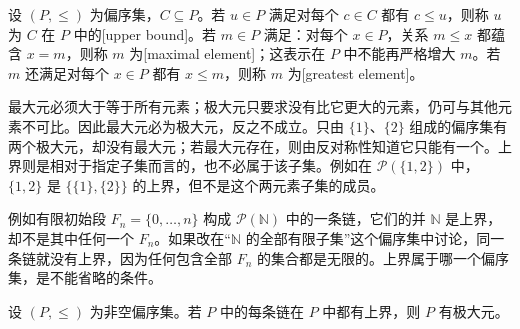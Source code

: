 \begin{definition}\label{b1:def:A-upper-maximal}
	设 \((P,\leq)\) 为偏序集，\(C\subseteq P\)。若 \(u\in P\) 满足对每个 \(c\in C\) 都有 \(c\leq u\)，则称 \(u\) 为 \(C\) 在 \(P\) 中的[upper bound]。若 \(m\in P\) 满足：对每个 \(x\in P\)，关系 \(m\leq x\) 都蕴含 \(x=m\)，则称 \(m\) 为[maximal element]；这表示在 \(P\) 中不能再严格增大 \(m\)。若 \(m\) 还满足对每个 \(x\in P\) 都有 \(x\leq m\)，则称 \(m\) 为[greatest element]。
\end{definition}

最大元必须大于等于所有元素；极大元只要求没有比它更大的元素，仍可与其他元素不可比。因此最大元必为极大元，反之不成立。只由 \(\{1\}\)、\(\{2\}\) 组成的偏序集有两个极大元，却没有最大元；若最大元存在，则由反对称性知道它只能有一个。上界则是相对于指定子集而言的，也不必属于该子集。例如在 \(\mathcal P(\{1,2\})\) 中，\(\{1,2\}\) 是 \(\{\{1\},\{2\}\}\) 的上界，但不是这个两元素子集的成员。

\ProseParagraphBreak
例如有限初始段 \(F_n=\{0,\ldots,n\}\) 构成 \(\mathcal P(\mathbb N)\) 中的一条链，它们的并 \(\mathbb N\) 是上界，却不是其中任何一个 \(F_n\)。如果改在“\(\mathbb N\) 的全部有限子集”这个偏序集中讨论，同一条链就没有上界，因为任何包含全部 \(F_n\) 的集合都是无限的。上界属于哪一个偏序集，是不能省略的条件。

\begin{theorem}[Zorn]\label{b1:thm:A-zorn}
	设 \((P,\leq)\) 为非空偏序集。若 \(P\) 中的每条链在 \(P\) 中都有上界，则 \(P\) 有极大元。
\end{theorem}

